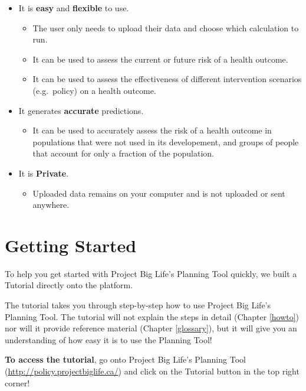 \documentclass[]{book}
\providecommand{\tightlist}{%
  \setlength{\itemsep}{0pt}\setlength{\parskip}{0pt}}
\begin{document}
\begin{itemize}
\item
  It is \textbf{easy} and \textbf{flexible} to use.

  \begin{itemize}
  \tightlist
  \item
    The user only needs to upload their data and choose which
    calculation to run.
  \item
    It can be used to assess the current or future risk of a health
    outcome.
  \item
    It can be used to assess the effectiveness of different intervention
    scenarios (e.g.~policy) on a health outcome.
  \end{itemize}
\item
  It generates \textbf{accurate} predictions.

  \begin{itemize}
  \tightlist
  \item
    It can be used to accurately assess the risk of a health outcome in
    populations that were not used in its developement, and groups of
    people that account for only a fraction of the population.
  \end{itemize}
\item
  It is \textbf{Private}.

  \begin{itemize}
  \tightlist
  \item
    Uploaded data remains on your computer and is not uploaded or sent
    anywhere.
  \end{itemize}
\end{itemize}

\chapter{Getting Started}\label{getting-started}

To help you get started with Project Big Life's Planning Tool quickly,
we built a Tutorial directly onto the platform.

The tutorial takes you through step-by-step how to use Project Big
Life's Planning Tool. The tutorial will not explain the steps in detail
(Chapter \ref{howto}) nor will it provide reference material (Chapter
\ref{glossary}), but it will give you an understanding of how easy it is
to use the Planning Tool!

\textbf{To access the tutorial}, go onto Project Big Life's Planning
Tool (\url{http://policy.projectbiglife.ca/}) and click on the Tutorial
button in the top right corner!
\end{document}
